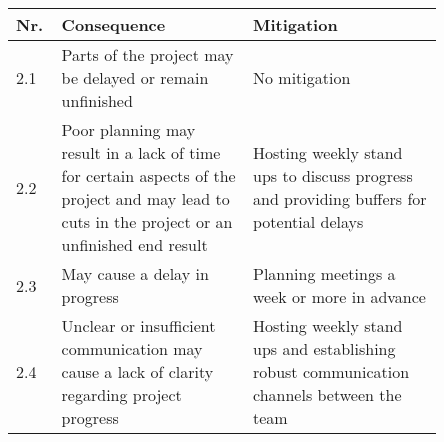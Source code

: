 \documentclass{article} %
\begin{document}
	\begin{center}
		\begin{tabular}{| p{0.05\linewidth} | p{0.4\linewidth} | p{0.4\linewidth} |}
			\hline
			Nr. & Consequence & Mitigation \\ [0.5ex] 
			\hline\hline
			2.1 & Parts of the project may be delayed or remain unfinished & No mitigation \\
			\hline
			2.2 & Poor planning may result in a lack of time for certain aspects of the project and may lead to cuts in the project or an unfinished end result & Hosting weekly stand ups to discuss progress and providing buffers for potential delays \\
			\hline
			2.3 & May cause a delay in progress & Planning meetings a week or more in advance \\
			\hline
			2.4 & Unclear or insufficient communication may cause a lack of clarity regarding project progress & Hosting weekly stand ups and establishing robust communication channels between the team \\
			\hline
		\end{tabular}
	\end{center}
    
    \newpage
\end{document}

